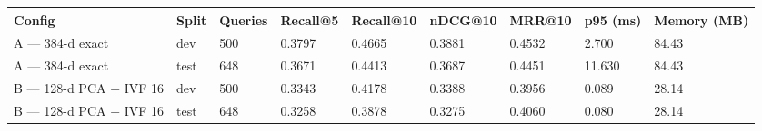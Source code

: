 \begin{tabular}{lllllllll}
\hline
Config & Split & Queries & Recall@5 & Recall@10 & nDCG@10 & MRR@10 & p95 (ms) & Memory (MB) \\
\hline
A --- 384-d exact & dev & 500 & 0.3797 & 0.4665 & 0.3881 & 0.4532 & 2.700 & 84.43 \\
A --- 384-d exact & test & 648 & 0.3671 & 0.4413 & 0.3687 & 0.4451 & 11.630 & 84.43 \\
B --- 128-d PCA + IVF 16 & dev & 500 & 0.3343 & 0.4178 & 0.3388 & 0.3956 & 0.089 & 28.14 \\
B --- 128-d PCA + IVF 16 & test & 648 & 0.3258 & 0.3878 & 0.3275 & 0.4060 & 0.080 & 28.14 \\
\hline
\end{tabular}
